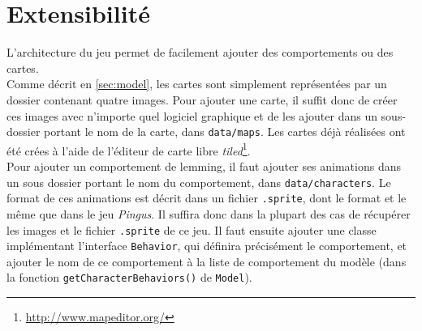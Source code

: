 \documentclass[a4paper,12pt]{article}
\begin{document}
\section{Extensibilité}
L'architecture du jeu permet de facilement ajouter des comportements
ou des cartes.\\

Comme décrit en \ref{sec:model}, les cartes sont simplement
représentées par un dossier contenant quatre images. Pour ajouter une
carte, il suffit donc de créer ces images avec n'importe quel logiciel
graphique et de les ajouter dans un sous-dossier portant le nom de la
carte, dans \texttt{data/maps}. Les cartes déjà réalisées ont été
crées à l'aide de l'éditeur de carte libre
\emph{tiled}\footnote{\url{http://www.mapeditor.org/}}.\\

Pour ajouter un comportement de lemming, il faut ajouter ses
animations dans un sous dossier portant le nom du comportement, dans
\texttt{data/characters}. Le format de ces animations est décrit dans
un fichier \texttt{.sprite}, dont le format et le même que dans le jeu
\emph{Pingus}. Il suffira donc dans la plupart des cas de récupérer
les images et le fichier \texttt{.sprite} de ce jeu. Il faut ensuite
ajouter une classe implémentant l'interface \texttt{Behavior}, qui
définira précisément le comportement, et ajouter le nom de ce
comportement à la liste de comportement du modèle (dans la fonction
\texttt{getCharacterBehaviors()} de \texttt{Model}).\\
\end{document}
